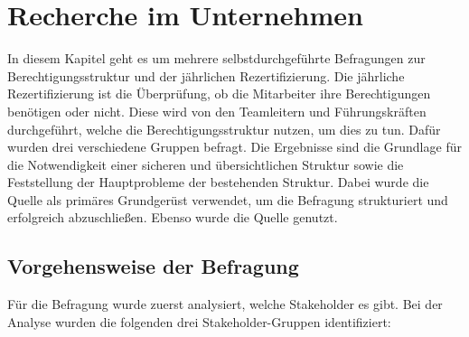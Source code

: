 \chapter{Recherche im Unternehmen}
\label{ch:Recherche}
In diesem Kapitel geht es um mehrere selbstdurchgeführte Befragungen zur Berechtigungsstruktur und der jährlichen Rezertifizierung.
Die jährliche Rezertifizierung ist die Überprüfung, ob die Mitarbeiter ihre Berechtigungen benötigen oder nicht.
Diese wird von den Teamleitern und Führungskräften durchgeführt, welche die Berechtigungsstruktur nutzen, um dies zu tun.
Dafür wurden drei verschiedene Gruppen befragt.
Die Ergebnisse sind die Grundlage für die Notwendigkeit einer sicheren und übersichtlichen Struktur sowie die Feststellung der Hauptprobleme der bestehenden Struktur.
Dabei wurde die Quelle \cite{HowSurvey} als primäres Grundgerüst verwendet, um die Befragung strukturiert und erfolgreich abzuschließen. Ebenso wurde die Quelle \cite{Survey} genutzt.

\section{Vorgehensweise der Befragung}
\label{sec:Vorgehensweise}
Für die Befragung wurde zuerst analysiert, welche Stakeholder es gibt.
Bei der Analyse wurden die folgenden drei Stakeholder-Gruppen identifiziert:


